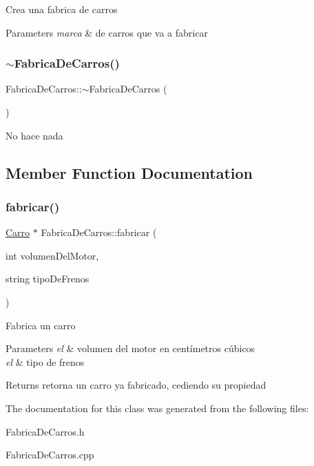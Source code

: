 Crea una fabrica de carros 
\begin{DoxyParams}{Parameters}
{\em marca} & de carros que va a fabricar \\
\hline
\end{DoxyParams}
\mbox{\label{classFabricaDeCarros_ac43e6f8fe999b922e00ba594dac05634}} 
\subsubsection{\texorpdfstring{$\sim$\+Fabrica\+De\+Carros()}{~FabricaDeCarros()}}
{\footnotesize\ttfamily Fabrica\+De\+Carros\+::$\sim$\+Fabrica\+De\+Carros (\begin{DoxyParamCaption}{ }\end{DoxyParamCaption})\hspace{0.3cm}{\ttfamily [virtual]}}

No hace nada 

\subsection{Member Function Documentation}
\mbox{\label{classFabricaDeCarros_a5cab084613807ac5088a417a079fa0c5}} 
\subsubsection{\texorpdfstring{fabricar()}{fabricar()}}
{\footnotesize\ttfamily \hyperlink{classCarro}{Carro} $\ast$ Fabrica\+De\+Carros\+::fabricar (\begin{DoxyParamCaption}\item[{int}]{volumen\+Del\+Motor,  }\item[{string}]{tipo\+De\+Frenos }\end{DoxyParamCaption})\hspace{0.3cm}{\ttfamily [virtual]}}

Fabrica un carro 
\begin{DoxyParams}{Parameters}
{\em el} & volumen del motor en centímetros cúbicos \\
\hline
{\em el} & tipo de frenos \\
\hline
\end{DoxyParams}
\begin{DoxyReturn}{Returns}
retorna un carro ya fabricado, cediendo su propiedad 
\end{DoxyReturn}


The documentation for this class was generated from the following files\+:\begin{DoxyCompactItemize}
\item 
Fabrica\+De\+Carros.\+h\item 
Fabrica\+De\+Carros.\+cpp\end{DoxyCompactItemize}
